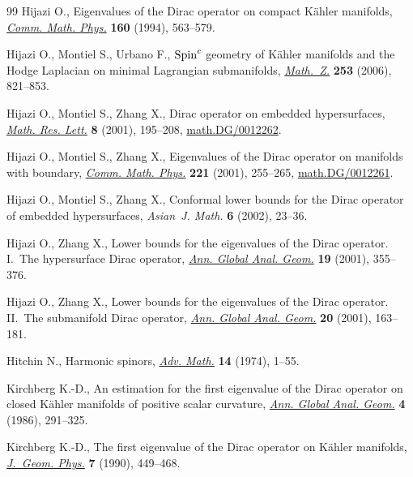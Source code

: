 \begin{thebibliography}{99}
Hijazi O., Eigenvalues of the {D}irac operator on compact {K}\"ahler manifolds,
  \href{http://dx.doi.org/10.1007/BF02173430}{\textit{Comm. Math. Phys.}} \textbf{160} (1994), 563--579.

Hijazi O., Montiel S., Urbano F., {${\rm Spin}^c$} geometry of {K}\"ahler
  manifolds and the {H}odge {L}aplacian on minimal {L}agrangian submanifolds,
  \href{http://dx.doi.org/10.1007/s00209-006-0936-8}{\textit{Math.~Z.}} \textbf{253} (2006), 821--853.

Hijazi O., Montiel S., Zhang X., Dirac operator on embedded hypersurfaces,
  \href{http://dx.doi.org/10.4310/MRL.2001.v8.n2.a8}{\textit{Math. Res. Lett.}} \textbf{8} (2001), 195--208,
  \href{http://arxiv.org/abs/math.DG/0012262}{math.DG/0012262}.

Hijazi O., Montiel S., Zhang X., Eigenvalues of the {D}irac operator on
  manifolds with boundary, \href{http://dx.doi.org/10.1007/s002200100475}{\textit{Comm. Math. Phys.}} \textbf{221} (2001),
  255--265, \href{http://arxiv.org/abs/math.DG/0012261}{math.DG/0012261}.

Hijazi O., Montiel S., Zhang X., Conformal lower bounds for the {D}irac
  operator of embedded hypersurfaces, \textit{Asian~J. Math.} \textbf{6}
  (2002), 23--36.

Hijazi O., Zhang X., Lower bounds for the eigenvalues of the {D}irac operator.
  {I}.~{T}he hypersurface {D}irac operator, \href{http://dx.doi.org/10.1023/A:1010749808691}{\textit{Ann. Global Anal. Geom.}}
  \textbf{19} (2001), 355--376.

Hijazi O., Zhang X., Lower bounds for the eigenvalues of the {D}irac operator.
  {II}.~{T}he submanifold {D}irac operator, \href{http://dx.doi.org/10.1023/A:1011663603699}{\textit{Ann. Global Anal. Geom.}}
  \textbf{20} (2001), 163--181.

Hitchin N., Harmonic spinors, \href{http://dx.doi.org/10.1016/0001-8708(74)90021-8}{\textit{Adv. Math.}} \textbf{14} (1974), 1--55.

Kirchberg K.-D., An estimation for the f\/irst eigenvalue of the {D}irac operator
  on closed {K}\"ahler manifolds of positive scalar curvature, \href{http://dx.doi.org/10.1007/BF00128050}{\textit{Ann.
  Global Anal. Geom.}} \textbf{4} (1986), 291--325.

Kirchberg K.-D., The f\/irst eigenvalue of the {D}irac operator on {K}\"ahler
  manifolds, \href{http://dx.doi.org/10.1016/0393-0440(90)90001-J}{\textit{J.~Geom. Phys.}} \textbf{7} (1990), 449--468.


\end{thebibliography}
